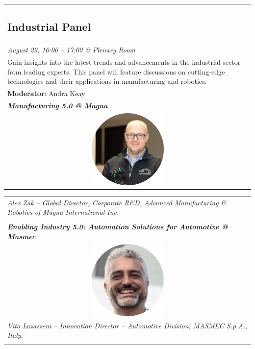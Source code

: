 \documentclass[
	openany, %
	parskip=full, %
	12pt, %
	a4paper, %
]{conferencebooklet} %
\begin{document}
\begin{multicols*}{2}
\begin{tabular}{p{75mm}}
            \parbox{75mm}{\subsection*{Industrial Panel}} \\ 
            \textit{August 29, 16:00 – 17:00 @ Plenary Room} \vspace{2mm} \\
            Gain insights into the latest trends and advancements in the industrial sector from leading experts. This panel will feature discussions on cutting-edge technologies and their applications in manufacturing and robotics. \vspace{2mm} \\
            \textbf{Moderator}: Andra Keay \vspace{2mm} \\
            \textit{\textbf{Manufacturing 5.0 @ Magna}} \vspace{2mm} \\
        \end{tabular}

        \begin{tabular}{p{75mm}}
            \textit{Alex Zak -- Global Director, Corporate R\&D, Advanced Manufacturing \& Robotics of Magna International Inc.} \\ \\ 
            \textit{\textbf{Enabling Industry 5.0: Automation Solutions for Automotive @ Masmec}} \vspace{2mm} \\
            \multicolumn{1}{c}{ \includegraphics[width=0.3\textwidth]{industrial-panel/lazazzera.png}} \vspace{2mm} \\
            \textit{Vito Lazazzera -- Innovation Director – Automotive Division, MASMEC S.p.A., Italy.} \\ \\
            

\end{tabular}
\end{multicols*}
\end{document}

